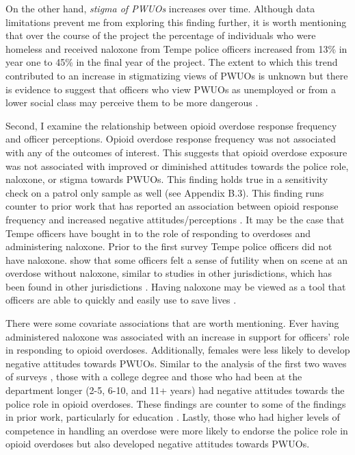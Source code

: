 On the other hand, \textit{stigma of PWUOs} increases over time. Although data limitations prevent me from exploring this finding further, it is worth mentioning that over the course of the project the percentage of individuals who were homeless and received naloxone from Tempe police officers increased from 13\% in year one to 45\% in the final year of the project. The extent to which this trend contributed to an increase in stigmatizing views of PWUOs is unknown but there is evidence to suggest that officers who view PWUOs as unemployed or from a lower social class may perceive them to be more dangerous \parencite{kruis_police_2020}.

Second, I examine the relationship between opioid overdose response frequency and officer perceptions. Opioid overdose response frequency was not associated with any of the outcomes of interest. This suggests that opioid overdose exposure was not associated with improved or diminished attitudes towards the police role, naloxone, or stigma towards PWUOs. This finding holds true in a sensitivity check on a patrol only sample as well (see Appendix B.3). This finding runs counter to prior work that has reported an association between opioid response frequency and increased negative attitudes/perceptions \parencite{carroll_knowledge_2020, murphy_police_2020, murphy_police_2021}. It may be the case that Tempe officers have bought in to the role of responding to overdoses and administering naloxone. Prior to the first survey Tempe police officers did not have naloxone. \textcite{white_moving_2021} show that some officers felt a sense of futility when on scene at an overdose without naloxone, similar to studies in other jurisdictions, which has been found in other jurisdictions \parencite{smiley-mcdonald_perspectives_2022}. Having naloxone may be viewed as a tool that officers are able to quickly and easily use to save lives \parencite{lloyd_its_2023}. 

There were some covariate associations that are worth mentioning. Ever having administered naloxone was associated with an increase in support for officers' role in responding to opioid overdoses. Additionally, females were less likely to develop negative attitudes towards PWUOs. Similar to the analysis of the first two waves of surveys \parencite{white_narcan_2021}, those with a college degree and those who had been at the department longer (2-5, 6-10, and 11+ years) had negative attitudes towards the police role in opioid overdoses. These findings are counter to some of the findings in prior work, particularly for education \parencite{jorgensen_badges_2018}. Lastly, those who had higher levels of competence in handling an overdose were more likely to endorse the police role in opioid overdoses but also developed negative attitudes towards PWUOs. 

